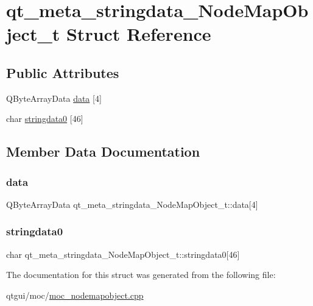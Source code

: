 \hypertarget{structqt__meta__stringdata___node_map_object__t}{}\section{qt\+\_\+meta\+\_\+stringdata\+\_\+\+Node\+Map\+Object\+\_\+t Struct Reference}
\label{structqt__meta__stringdata___node_map_object__t}
\subsection*{Public Attributes}
\begin{DoxyCompactItemize}
\item 
Q\+Byte\+Array\+Data \mbox{\hyperlink{structqt__meta__stringdata___node_map_object__t_a53da2de8a5b6bff558f7dbf463017fc9}{data}} \mbox{[}4\mbox{]}
\item 
char \mbox{\hyperlink{structqt__meta__stringdata___node_map_object__t_a1351b6358102d5b7ab2447f95681b5d9}{stringdata0}} \mbox{[}46\mbox{]}
\end{DoxyCompactItemize}


\subsection{Member Data Documentation}
\mbox{\label{structqt__meta__stringdata___node_map_object__t_a53da2de8a5b6bff558f7dbf463017fc9}} 
\subsubsection{\texorpdfstring{data}{data}}
{\footnotesize\ttfamily Q\+Byte\+Array\+Data qt\+\_\+meta\+\_\+stringdata\+\_\+\+Node\+Map\+Object\+\_\+t\+::data\mbox{[}4\mbox{]}}

\mbox{\label{structqt__meta__stringdata___node_map_object__t_a1351b6358102d5b7ab2447f95681b5d9}} 
\subsubsection{\texorpdfstring{stringdata0}{stringdata0}}
{\footnotesize\ttfamily char qt\+\_\+meta\+\_\+stringdata\+\_\+\+Node\+Map\+Object\+\_\+t\+::stringdata0\mbox{[}46\mbox{]}}



The documentation for this struct was generated from the following file\+:\begin{DoxyCompactItemize}
\item 
qtgui/moc/\mbox{\hyperlink{moc__nodemapobject_8cpp}{moc\+\_\+nodemapobject.\+cpp}}\end{DoxyCompactItemize}
